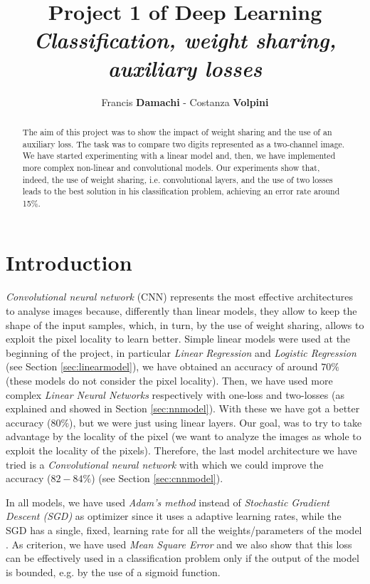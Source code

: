 \documentclass[journal, a4paper]{IEEEtran}
\begin{document}
	\title{Project 1 of Deep Learning\\ \textit{\Large{Classification, weight sharing, auxiliary losses}}}
	\author{Francis \textbf{Damachi} - Costanza \textbf{Volpini}}
	\maketitle
	
\begin{abstract}
The aim of this project was to show the impact of weight sharing and the use of an auxiliary loss. The task was to compare two digits represented as a two-channel image. We have started experimenting with a linear model and, then, we have implemented more complex non-linear and convolutional models. Our experiments show that, indeed, the use of weight sharing, i.e. convolutional layers, and the use of two losses leads to the best solution in his classification problem, achieving an error rate around 15\%.
\end{abstract}

\section{Introduction}
\label{sec:intro}
\textit{Convolutional neural network} (CNN) represents the most effective architectures to analyse images because, differently than linear models, they allow to keep the shape of the input samples, which, in turn, by the use of weight sharing, allows to exploit the pixel locality to learn better.
Simple linear models were used at the beginning of the project, in particular \textit{Linear Regression} and \textit{Logistic Regression} (see Section \ref{sec:linearmodel}), we have obtained an accuracy of around $70\%$ (these models do not consider the pixel locality). Then, we have used more complex \textit{Linear Neural Networks} respectively with one-loss and two-losses (as explained and showed in Section \ref{sec:nnmodel}). With these we have got a better accuracy ($80\%$), but we were just using linear layers. Our goal, was to try to take advantage by the locality of the pixel (we want to analyze the images as whole to exploit the locality of the pixels). Therefore, the last model architecture we have tried is a \textit{Convolutional neural network} with which we could improve the accuracy ($82-84\%$) (see Section \ref{sec:cnnmodel}).

In all models, we have used \textit{Adam's method} instead of \textit{Stochastic Gradient Descent (SGD)} as optimizer since it uses a adaptive learning rates, while the SGD has a single, fixed, learning rate for all the weights/parameters of the model \cite{reference0}.
As criterion, we have used \textit{Mean Square Error} and we also show that this loss can be effectively used in a classification problem only if the output of the model is bounded, e.g. by the use of a sigmoid function.
\end{document}
